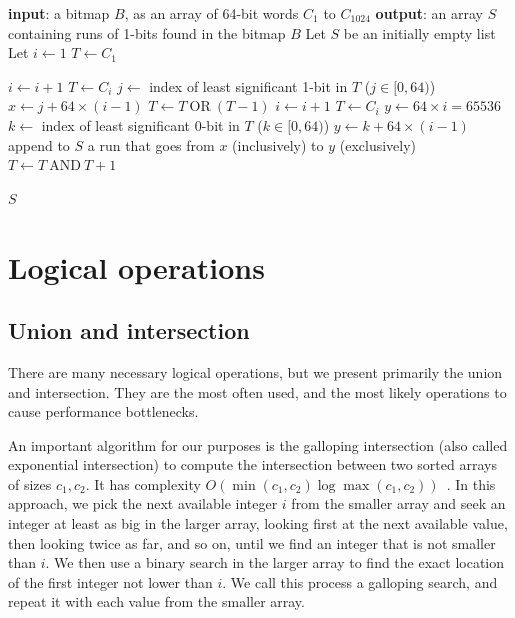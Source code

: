 \documentclass[times]{speauth}
\begin{document}
\begin{algorithm}
\caption{\label{algo:extract}Algorithm to convert the set bits in a bitmap into a list of runs. We assume two-complement's 64-bit arithmetic.
 We use the bitwise AND and OR operations.
}
\centering
\begin{algorithmic}[1]
\STATE \textbf{input}:  a bitmap $B$, as an array of 64-bit words $C_1$ to $C_{1024}$
\STATE \textbf{output}: an array $S$ containing runs of  1-bits found in the bitmap $B$
\STATE Let $S$ be an initially empty list
\STATE Let $i \leftarrow 1$
\STATE $T \leftarrow C_1$

\STATE $i \leftarrow i+1$
\STATE $T \leftarrow C_i$
\ELSE
\STATE $j \leftarrow $ index of least significant 1-bit in $T$ ($j\in [0,64)$)
\STATE $x \leftarrow j + 64 \times (i - 1)$
\STATE $T \leftarrow  T \mathrm{~OR~} (T - 1)$ \hfill {}
\STATE $i \leftarrow i+1$
\STATE $T \leftarrow C_i$
\ENDWHILE
{}
\STATE  $y \leftarrow 64 \times i = 65536$ \hfill {}
\ELSE
\STATE $k \leftarrow $ index of least significant 0-bit in $T$  ($k\in [0,64)$)
\STATE $y \leftarrow k + 64 \times (i-1)$
\ENDIF
\STATE append to $S$ a run that goes from $x$ (inclusively) to $y$ (exclusively)
\STATE $T \leftarrow T \mathrm{~AND~}  T+1$  \hfill {}

\ENDIF
\ENDWHILE
\RETURN $S$
\end{algorithmic}
\end{algorithm}



\section{Logical operations}\label{sec:logicalOp}

\subsection{Union and intersection}

There are many necessary logical operations, but we present primarily the union and intersection.  They are the most often used, and the most likely operations to
cause performance bottlenecks.

An important algorithm for our purposes is the galloping intersection  (also called exponential intersection) to compute the intersection
between two sorted arrays of sizes $c_1,c_2$. It has  complexity $O(\min(c_1,c_2) \log \max(c_1,c_2))$~\cite{bentley1976almost}. In this  approach,  we pick the next available integer $i$ from the smaller array and seek an integer at least as big in the larger array, looking first at the next available value, then looking twice as far, and so on, until we find an integer that is
not smaller than $i$.
We then use a binary search in the larger array to find the exact location of the first integer not lower than $i$.
We call this process a  galloping search, and repeat it with each value from the smaller array.
\end{document}
